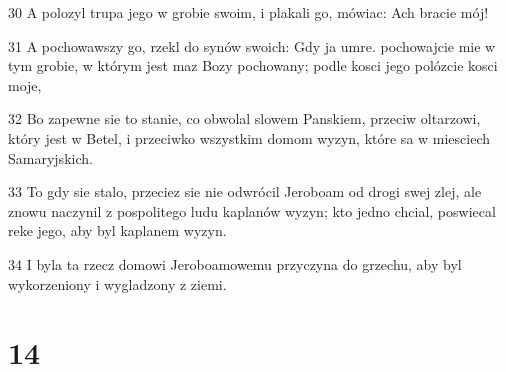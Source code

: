 \par 30 A polozyl trupa jego w grobie swoim, i plakali go, mówiac: Ach bracie mój!
\par 31 A pochowawszy go, rzekl do synów swoich: Gdy ja umre. pochowajcie mie w tym grobie, w którym jest maz Bozy pochowany; podle kosci jego polózcie kosci moje,
\par 32 Bo zapewne sie to stanie, co obwolal slowem Panskiem, przeciw oltarzowi, który jest w Betel, i przeciwko wszystkim domom wyzyn, które sa w miesciech Samaryjskich.
\par 33 To gdy sie stalo, przeciez sie nie odwrócil Jeroboam od drogi swej zlej, ale znowu naczynil z pospolitego ludu kaplanów wyzyn; kto jedno chcial, poswiecal reke jego, aby byl kaplanem wyzyn.
\par 34 I byla ta rzecz domowi Jeroboamowemu przyczyna do grzechu, aby byl wykorzeniony i wygladzony z ziemi.

\chapter{14}

